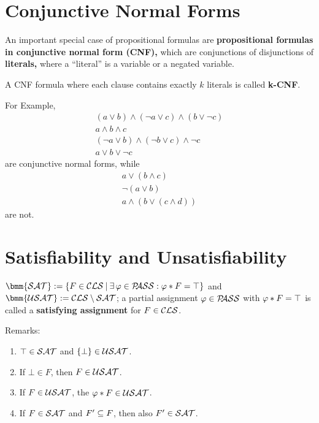 \documentclass[12pt]{book}
\begin{document}
\section{Conjunctive Normal Forms}
\label{sec:Conjunctive Normal Forms}

\begin{defi}\label{def:CNF}
  An important special case of propositional formulas are \textbf{propositional formulas in conjunctive normal form (CNF),} which are
conjunctions of disjunctions of \textbf{literals,}  where a ``literal'' is a variable or a negated variable.  
\end{defi}

\begin{defi}\label{def:CNF-2}
A CNF formula where each clause contains exactly $k$ literals is called \textbf{k-CNF}.
\end{defi}

\begin{examp}\label{exp:cnf}
For Example, \begin{eqnarray*}
&(a\vee b) \wedge (\neg a \vee c) \wedge (b\vee \neg c)& \\
&a\wedge b \wedge c& \\
&(\neg a \vee b) \wedge (\neg b \vee c) \wedge \neg c& \\
&a \vee b \vee \neg c&
\end{eqnarray*} are conjunctive normal forms, while
\begin{eqnarray*}
&a\vee (b \wedge c)&\\
&\neg(a\vee b)& \\
&a \wedge (b\vee (c\wedge d))&
\end{eqnarray*}
are not. 
\end{examp}

\section{Satisfiability and Unsatisfiability}
\label{sec:Satisfiability and Unsatisfiability}

\begin{defi}\label{def:sat}
  $\bmm{\Sat} := \set{F \in \Cls \mb \ex\, \vp \in \Pass : \vp * F = \top}$ and $\bmm{\Usat} := \Cls \sm \Sat$; a partial assignment $\varphi \in \mathcal{P\hspace{-0.32em}ASS}$ with $\varphi * F = \top$ is called a \textbf{satisfying assignment} for $F \in \mathcal{CLS}$.
\end{defi}
Remarks:
\begin{enumerate}
\item $\top \in \mathcal{SAT}$ and $\{ \bot \} \in \mathcal{USAT}$.
\item If $\bot \in F$, then $F \in \mathcal{USAT}$.
\item If $F \in \mathcal{USAT}$, the $\varphi * F \in \mathcal{USAT}$.
\item If $F \in \mathcal{SAT}$ and $F' \subseteq F$, then also $F' \in \mathcal{SAT}$.
\end{enumerate}
\end{document}
